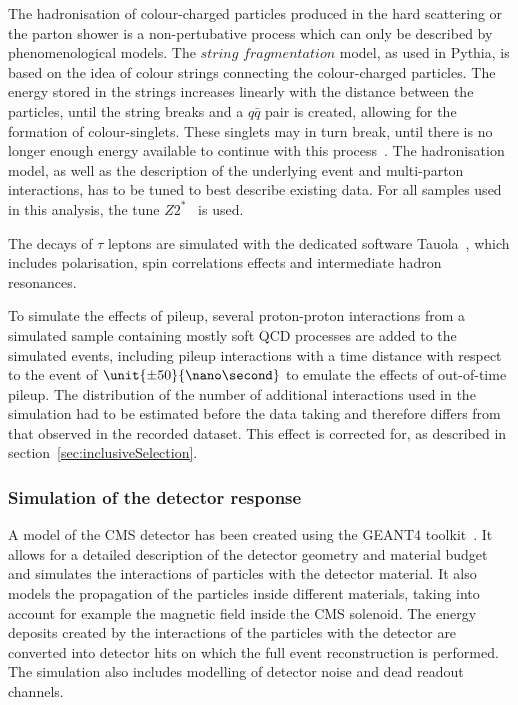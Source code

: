 The hadronisation of colour-charged particles produced in the hard scattering or the parton shower is a non-pertubative process which can only be described by phenomenological models. The $\textit{string fragmentation}$ model, as used in Pythia, is based on the idea of colour strings connecting the colour-charged particles. The energy stored in the strings increases linearly with the distance between the  particles, until the string breaks and a $q\bar{q}$ pair is created, allowing for the formation of colour-singlets. These singlets may in turn break, until there is no longer enough energy available to continue with this process~\cite{Pythia}. The hadronisation model, as well as the description of the underlying event and multi-parton interactions, has to be tuned to best describe existing data. For all samples used in this analysis, the tune $Z2^{*}$~\cite{Field:2011iq} is used. 

The decays of $\tau$ leptons are simulated with the dedicated software Tauola~\cite{Jadach1993361}, which includes polarisation, spin correlations effects and intermediate hadron resonances. 

To simulate the effects of pileup, several proton-proton interactions from a simulated sample containing mostly soft QCD processes are added to the simulated events, including pileup interactions with a time distance with respect to the event of $\unit{\pm50}{\nano\second}$ to emulate the effects of out-of-time pileup. The distribution of the number of additional interactions used in the simulation had to be estimated before the data taking and therefore differs from that observed in the recorded dataset. This effect is corrected for, as described in section~\ref{sec:inclusiveSelection}.

\subsubsection{Simulation of the detector response}
A model of the CMS detector has been created using the GEANT4 toolkit~\cite{Agostinelli:2002hh}. It allows for a detailed description of the detector geometry and material budget and simulates the interactions of particles with the detector material. It also models the propagation of the particles inside different materials, taking into account for example the magnetic field inside the CMS solenoid. The energy deposits created by the interactions of the particles with the detector are converted into detector hits on which the full event reconstruction is performed. The simulation also includes modelling of detector noise and dead readout channels.  

